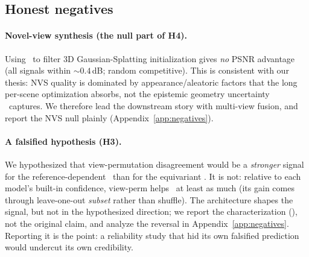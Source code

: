 \begin{table}[tb]
  \centering\small
  \caption{\textbf{Fused-cloud quality} (lower is better). \trustr-filtered fusion is near-oracle and,
  on DTU, preserves much more completeness than confidence-filtering.}
  \label{tab:fusion}
\end{table}

\subsection{Honest negatives}
\label{sec:exp-neg}

\paragraph{Novel-view synthesis (the null part of H4).} Using \trustr\ to filter 3D Gaussian-Splatting
initialization gives \emph{no} PSNR advantage (all signals within $\sim 0.4$\,dB; random competitive).
This is consistent with our thesis: NVS quality is dominated by appearance/aleatoric factors that the
long per-scene optimization absorbs, not the epistemic geometry uncertainty \trustr\ captures. We
therefore lead the downstream story with multi-view fusion, and report the NVS null plainly
(Appendix~\ref{app:negatives}).

\paragraph{A falsified hypothesis (H3).} We hypothesized that view-permutation disagreement would be a
\emph{stronger} signal for the reference-dependent \vggt\ than for the equivariant \pii. It is not:
relative to each model's built-in confidence, view-perm helps \pii\ at least as much (its gain comes
through leave-one-out \emph{subset} rather than shuffle). The architecture shapes the signal, but not
in the hypothesized direction; we report the characterization (), not the original
claim, and analyze the reversal in Appendix~\ref{app:negatives}. Reporting it is the point: a reliability
study that hid its own falsified prediction would undercut its own credibility.

